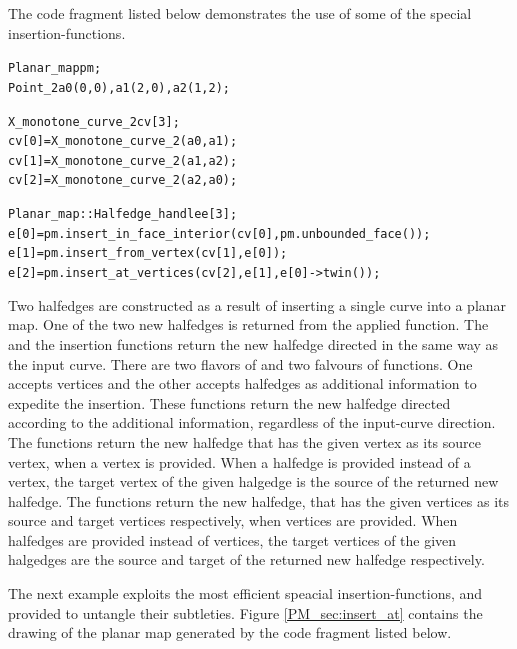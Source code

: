 The code fragment listed below demonstrates the use of some of the
special insertion-functions.

\begin{alltt}
  Planar_map pm;
  Point_2 a0(0, 0), a1(2, 0), a2(1, 2);

  X_monotone_curve_2 cv[3];
  cv[0] = X_monotone_curve_2(a0, a1);
  cv[1] = X_monotone_curve_2(a1, a2);
  cv[2] = X_monotone_curve_2(a2, a0);

  Planar_map::Halfedge_handle e[3];  
  e[0] = pm.insert_in_face_interior(cv[0], pm.unbounded_face());
  e[1] = pm.insert_from_vertex(cv[1], e[0]);
  e[2] = pm.insert_at_vertices(cv[2], e[1], e[0]->twin());
\end{alltt}

Two halfedges are constructed as a result of inserting a single curve into a
planar map. One of the two new halfedges is returned from the applied function.
The  and the  insertion functions
return the new halfedge directed in the same way as the input curve. There are
two flavors of  and two falvours of
 functions. One accepts vertices and the other
accepts halfedges as additional information to expedite the insertion. These
functions return the new halfedge directed according to the additional
information, regardless of the input-curve direction. The
 functions return the new halfedge that has the given
vertex as its source vertex, when a vertex is provided. When a halfedge is
provided instead of a vertex, the target vertex of the given halgedge is the
source of the returned new halfedge. The  functions
return the new halfedge, that has the given vertices as its source and target
vertices respectively, when vertices are provided. When halfedges are provided
instead of vertices, the target vertices of the given halgedges are the source
and target of the returned new halfedge respectively.

The next example exploits the most efficient speacial insertion-functions, and
provided to untangle their subtleties. Figure \ref{PM_sec:insert_at} contains
the drawing of the planar map generated by the code fragment listed below.

